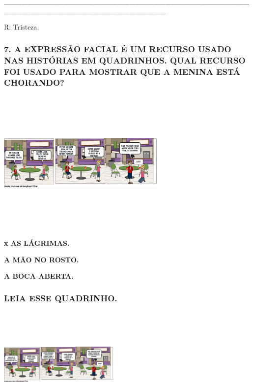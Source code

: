 \textbf{\_\_\_\_\_\_\_\_\_\_\_\_\_\_\_\_\_\_\_\_\_\_\_\_\_\_\_\_\_\_\_\_\_\_\_\_\_\_\_\_\_\_\_\_\_\_\_\_\_\_\_\_\_\_\_\_\_\_\_\_\_\_\_\_\_\_\_\_}

R: Tristeza.

\subsubsection{7. A EXPRESSÃO FACIAL É UM RECURSO USADO NAS HISTÓRIAS EM
QUADRINHOS. QUAL RECURSO FOI USADO PARA MOSTRAR QUE A MENINA ESTÁ
CHORANDO?}\label{a-expressuxe3o-facial-uxe9-um-recurso-usado-nas-histuxf3rias-em-quadrinhos.-qual-recusro-foi-usado-para-mostrar-que-a-menina-estuxe1-chorando}

\includegraphics[width=3.23889in,height=2.81042in]{media/image173.png}

\protect\hypertarget{_heading=h.ihv636}{}{}

\textbf{x AS LÁGRIMAS.}

\textbf{A MÃO NO ROSTO.}

\textbf{A BOCA ABERTA.}

\subsubsection{LEIA ESSE QUADRINHO.}\label{leia-esse-quadrinho.}

\includegraphics[width=2.31319in,height=2.23333in]{media/image175.png}

